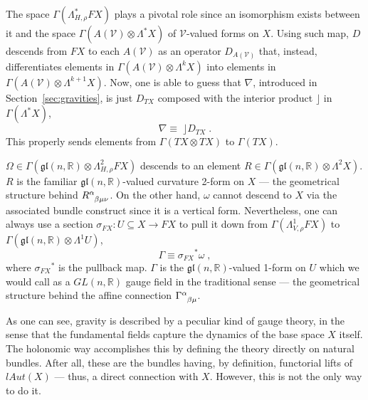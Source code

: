 \documentclass[../../main.tex]{subfiles}
\begin{document}
The space $\Gamma\left(\Lambda^*_{H,\rho}FX\right)$ plays a pivotal role since an isomorphism exists between it and the space $\Gamma\left(A\left(\mathcal{V}\right)\otimes \Lambda^*X\right)$ of $\mathcal{V}$-valued forms on $X$. Using such map, $D$ descends from $FX$ to each $A\left(\mathcal{V}\right)$ as an operator $D_{A\left(\mathcal{V}\right)}$ that, instead, differentiates elements in $\Gamma\left(A\left(\mathcal{V}\right)\otimes \Lambda^k X \right)$ into elements in $\Gamma\left(A\left(\mathcal{V}\right)\otimes \Lambda^{k+1}X\right)$. Now, one is able to guess that $\nabla$, introduced in Section~\ref{sec:gravities}, is just $D_{TX}$ composed with the interior product $\rfloor$ in $\Gamma\left(\Lambda^*X\right)$,
\begin{equation}
  \label{eq:cov.diff.}
  \nabla \equiv \;\rfloor D_{TX} \;.
\end{equation}
This properly sends elements from $\Gamma\left(TX\otimes TX\right)$ to $\Gamma\left(TX\right)$.

$ \Omega \in \Gamma\left(\mathfrak{gl}\left( n, \mathbb{R} \right) \otimes \Lambda^2_{H,\rho}FX\right)$ descends to an element $R \in \Gamma\left(\mathfrak{gl}\left(n,\mathbb{R}\right)\otimes\Lambda^2X\right)$. $ R $ is the familiar $\mathfrak{gl}\left(n,\mathbb{R}\right)$-valued curvature 2-form on $X$ --- the geometrical structure behind $\tensor{R}{^\alpha_{\beta\mu\nu}}$. On the other hand, $\omega$ cannot descend to $X$ via the associated bundle construct since it is a vertical form. Nevertheless, one can always use a section $\sigma_{FX}: U \subseteq X \rightarrow FX$ to pull it down from $\Gamma\left(\Lambda^1_{V,\rho}FX\right)$ to $\Gamma\left(\mathfrak{gl}\left(n,\mathbb{R}\right)\otimes \Lambda^1 U\right)$,
\begin{equation}
  \label{eq:local_connection}
  \Gamma \equiv {\sigma_{FX}}^* \omega \;,
\end{equation}
where ${\sigma_{FX}}^*$ is the pullback map. $\Gamma$ is the $\mathfrak{gl}\left(n,\mathbb{R}\right)$-valued 1-form on $U$ which we would call as a $GL\left(n,\mathbb{R}\right)$ gauge field in the traditional sense --- the geometrical structure behind the affine connection $\tensor{\Gamma}{^\alpha_{\beta\mu}}$.

As one can see, gravity is described by a peculiar kind of gauge theory, in the sense that the fundamental fields capture the dynamics of the base space $X$ itself. The holonomic way accomplishes this by defining the theory directly on natural bundles. After all, these are the bundles having, by definition, functorial lifts of $lAut\left(X\right)$ --- thus, a direct connection with $X$. However, this is not the only way to do it.
\end{document}
